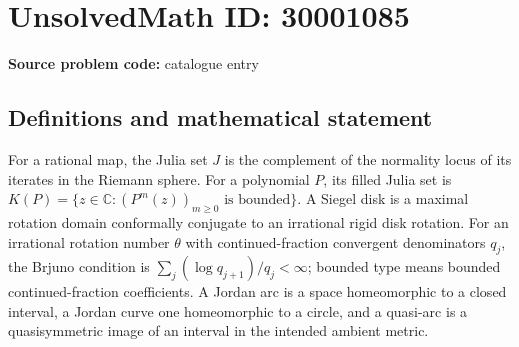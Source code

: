 \documentclass[11pt]{article}
\newcommand{\C}{\mathbb{C}}
\begin{document}
\section*{UnsolvedMath ID: 30001085}
\textbf{Source problem code:} catalogue entry
\subsection{Definitions and mathematical statement}
For a rational map, the Julia set \(J\) is the complement of the normality locus of its iterates in the Riemann sphere. For a polynomial \(P\), its filled Julia set is \(K(P)=\{z\in\C:(P^m(z))_{m\geq0}\text{ is bounded}\}\). A Siegel disk is a maximal rotation domain conformally conjugate to an irrational rigid disk rotation. For an irrational rotation number \(\theta\) with continued-fraction convergent denominators \(q_j\), the Brjuno condition is \(\sum_j(\log q_{j+1})/q_j<\infty\); bounded type means bounded continued-fraction coefficients. A Jordan arc is a space homeomorphic to a closed interval, a Jordan curve one homeomorphic to a circle, and a quasi-arc is a quasisymmetric image of an interval in the intended ambient metric.
\end{document}
